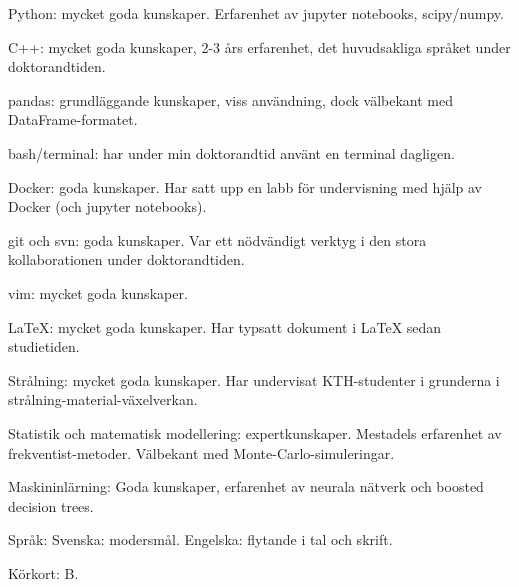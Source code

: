 



\begin{cvskills}



\cvskill
{Python:}
{mycket goda kunskaper. Erfarenhet av jupyter notebooks, scipy/numpy.}

\cvskill
{C++:}
{mycket goda kunskaper, 2-3 års erfarenhet, det huvudsakliga språket under doktorandtiden.}

\cvskill
{pandas:}
{grundläggande kunskaper, viss användning, dock välbekant med DataFrame-formatet.}

\cvskill
{bash/terminal:}
{har under min doktorandtid anv{\"a}nt en terminal dagligen.}

\cvskill
{Docker:} 
{goda kunskaper. Har satt upp en labb f{\"o}r undervisning med hj{\"a}lp av Docker (och jupyter notebooks).}

\cvskill
{git och svn:}
{goda kunskaper. Var ett n{\"o}dv{\"a}ndigt verktyg i den stora kollaborationen under doktorandtiden.}

\cvskill
{vim:}
{mycket goda kunskaper.}

\cvskill
{LaTeX:}
{mycket goda kunskaper. Har typsatt dokument i LaTeX sedan studietiden.}

\cvskill
{Strålning:}
{mycket goda kunskaper. Har undervisat KTH-studenter i grunderna i strålning-material-växelverkan.}

\cvskill
{Statistik och} {}
\cvskill
{matematisk modellering:}
{expertkunskaper. Mestadels erfarenhet av frekventist-metoder. V{\"a}lbekant med Monte-Carlo-simuleringar.}

\cvskill
{Maskininlärning:}
{Goda kunskaper, erfarenhet av neurala nätverk och boosted decision trees.}

\cvskill
{Spr{\aa}k:}
{Svenska: modersm{\aa}l. Engelska: flytande i tal och skrift.}

\cvskill
{Körkort:}
{B.}


\end{cvskills}